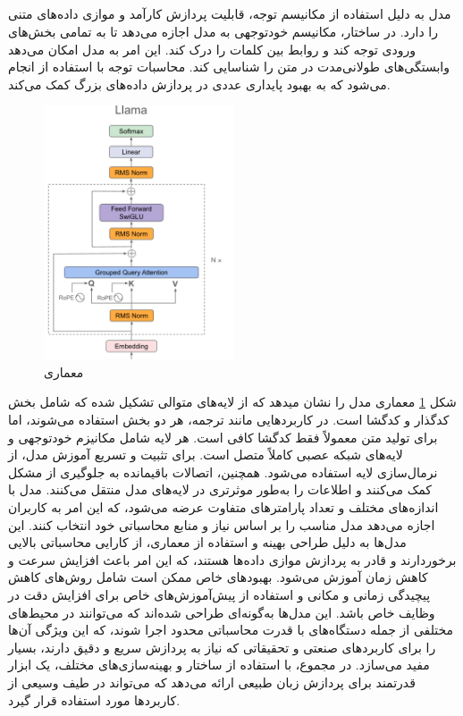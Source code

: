 \subsection{}
مدل  به دلیل استفاده از مکانیسم توجه، قابلیت پردازش کارآمد و موازی داده‌های متنی را دارد. در ساختار، مکانیسم خودتوجهی به مدل اجازه می‌دهد تا به تمامی بخش‌های ورودی توجه کند و روابط بین کلمات را درک کند. این امر به مدل امکان می‌دهد وابستگی‌های طولانی‌مدت در متن را شناسایی کند. محاسبات توجه با استفاده از انجام می‌شود که به بهبود پایداری عددی در پردازش داده‌های بزرگ کمک می‌کند.
\begin{figure}[H]
	\centering
	\includegraphics[width=0.5\textwidth]{figures/LLaMA.png}
	\caption{معماری }
	\label{fig:LLaMA}
\end{figure}
شکل \ref{fig:LLaMA} معماری مدل  را نشان میدهد که از لایه‌های متوالی تشکیل شده که شامل بخش کدگذار و کدگشا است. در کاربردهایی مانند ترجمه، هر دو بخش استفاده می‌شوند، اما برای تولید متن معمولاً فقط کدگشا کافی است. هر لایه شامل مکانیزم خودتوجهی و لایه‌های شبکه عصبی کاملاً متصل است. برای تثبیت و تسریع آموزش مدل، از نرمال‌سازی لایه استفاده می‌شود. همچنین، اتصالات باقیمانده به جلوگیری از مشکل کمک می‌کنند و اطلاعات را به‌طور موثرتری در لایه‌های مدل منتقل می‌کنند.
مدل  با اندازه‌های مختلف و تعداد پارامترهای متفاوت عرضه می‌شود، که این امر به کاربران اجازه می‌دهد مدل مناسب را بر اساس نیاز و منابع محاسباتی خود انتخاب کنند. این مدل‌ها به دلیل طراحی بهینه و استفاده از معماری، از کارایی محاسباتی بالایی برخوردارند و قادر به پردازش موازی داده‌ها هستند، که این امر باعث افزایش سرعت و کاهش زمان آموزش می‌شود.
بهبودهای خاص  ممکن است شامل روش‌های کاهش پیچیدگی زمانی و مکانی و استفاده از پیش‌آموزش‌های خاص برای افزایش دقت در وظایف خاص باشد. این مدل‌ها به‌گونه‌ای طراحی شده‌اند که می‌توانند در محیط‌های مختلفی از جمله دستگاه‌های با قدرت محاسباتی محدود اجرا شوند، که این ویژگی آن‌ها را برای کاربردهای صنعتی و تحقیقاتی که نیاز به پردازش سریع و دقیق دارند، بسیار مفید می‌سازد.
در مجموع،  با استفاده از ساختار و بهینه‌سازی‌های مختلف، یک ابزار قدرتمند برای پردازش زبان طبیعی ارائه می‌دهد که می‌تواند در طیف وسیعی از کاربردها مورد استفاده قرار گیرد.\cite{touvron2023llama}


